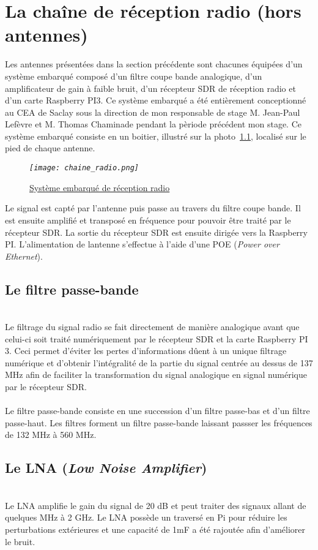 \documentclass[12pt,fleqn]{book} %
\begin{document}
\chapter{La chaîne de réception radio (hors antennes)}
Les antennes présentées dans la section précédente sont chacunes équipées d'un système embarqué composé d'un filtre coupe bande analogique, d'un amplificateur de gain à faible bruit, d'un récepteur SDR de réception radio et d'un carte Raspberry PI3. Ce système embarqué a été entièrement conceptionné au CEA de Saclay sous la direction de mon responsable de stage M. Jean-Paul Lefèvre et M. Thomas Chaminade pendant la pèriode précédent mon stage.
Ce système embarqué consiste en un boitier, illustré sur la photo~\underline{\color{blue}\ref{boîtier}}, localisé sur le pied de chaque antenne.
\begin{figure}[H]
	\centering
	\itshape
	\texttt{[image: chaine\_radio.png]}
	\caption{\label{boîtier} \underline{Système embarqué de réception radio}}
\end{figure}
Le signal est capté par l'antenne puis passe au travers du filtre coupe bande. Il est ensuite amplifié et transposé en fréquence pour pouvoir être traité par le récepteur SDR. La sortie du récepteur SDR est ensuite dirigée vers la Raspberry PI. L'alimentation de lantenne s'effectue à l'aide d'une POE (\emph{Power over Ethernet}).
\section{Le filtre passe-bande}
~\\\indent Le filtrage du signal radio se fait directement de manière analogique avant que celui-ci soit traité numériquement par le récepteur SDR et la carte Raspberry PI 3. Ceci permet d'éviter les pertes d'informations dûent à un unique filtrage numérique et d'obtenir l'intégralité de la partie du signal centrée au dessus de 137 MHz afin de faciliter la transformation du signal analogique en signal numérique par le récepteur SDR.
~\\\\Le filtre passe-bande consiste en une succession d'un filtre passe-bas et d'un filtre passe-haut. Les filtres forment un filtre passe-bande laissant passser les fréquences de 132 MHz à 560 MHz.
\section{Le LNA (\emph{Low Noise Amplifier})}
~\\\indent Le LNA amplifie le gain du signal de 20 dB et peut traiter des signaux allant de quelques MHz à 2 GHz. Le LNA possède un traversé en Pi pour réduire les perturbations extérieures et une capacité de 1mF a été rajoutée afin d’améliorer le bruit.
\end{document}
